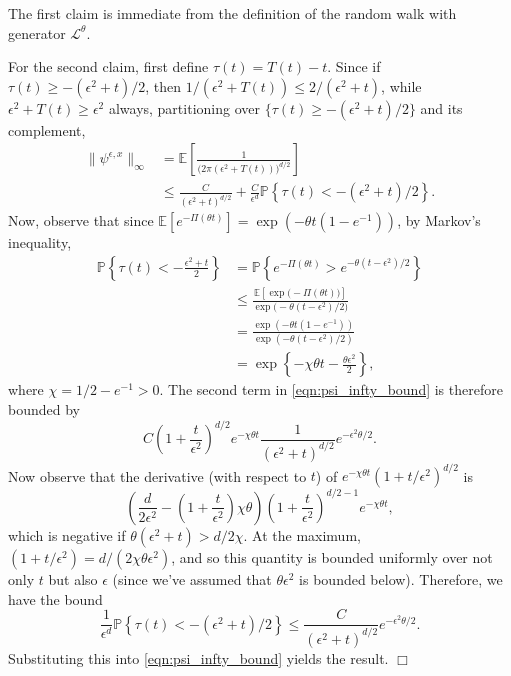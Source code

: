 \documentclass[12pt]{article}
\newenvironment {proof}{{\noindent\bf Proof }}{\hfill $\Box$ \medskip}
\newcommand{\IP}{\mathbb P}
\newcommand{\IE}{\mathbb E}
\numberwithin{equation}{section}
\begin{document}
\begin{proof}
    The first claim is immediate from the definition of the random walk 
with generator $\mathcal{L}^\theta$.

For the second claim, first define $\tau(t) = T(t)-t$.
Since if $\tau(t) \ge -(\epsilon^2 + t)/2$,
then $1/(\epsilon^2 + T(t)) \le 2/(\epsilon^2 + t)$,
while $\epsilon^2 + T(t) \ge \epsilon^2$ always,
partitioning over
$\{ \tau(t) \ge -(\epsilon^2 + t)/2 \}$ and its complement,
\begin{align}
   \| \psi^{\epsilon,x} \|_\infty
    &=
        \IE\left[ 
            \frac{1}{\big(2 \pi (\epsilon^2+T(t))\big)^{d/2}}
        \right] \nonumber
    \\ & \le
        \frac{C}{(\epsilon^2 + t)^{d/2}}
        + 
        \frac{C}{\epsilon^d}
        \IP\left\{
            \tau(t) < - (\epsilon^2 + t) / 2
        \right\}. \label{eqn:psi_infty_bound}
\end{align}
Now, observe that since $\IE[e^{-\Pi(\theta t)}] = \exp(-\theta t (1 - e^{-1}))$,
by Markov's inequality,
\begin{align}
    \IP\left\{
        \tau(t) < - \frac{\epsilon^2 + t}{2}
    \right\}
    &=
    \IP\left\{
        e^{-\Pi(\theta t)} > e^{-\theta (t - \epsilon^2) / 2}
    \right\}
\nonumber
\\
&\leq \frac{\IE[\exp\big(-\Pi(\theta t)\big)]}{\exp\big(-\theta(t-\epsilon^2)/2\big)}
\nonumber
    \\&=
    \frac{
        \exp(- \theta t(1 - e^{-1}))
    }{
        \exp(- \theta (t - \epsilon^2) / 2)
    }
\nonumber
    \\&=
    \exp\left\{ - \chi \theta t - \frac{\theta \epsilon^2}{2} \right\} ,
\label{bound for negative tau}
\end{align}
where $\chi = 1/2 - e^{-1} > 0$.
The second term in \eqref{eqn:psi_infty_bound} is therefore bounded by
\[
	C \left(1 + \frac{t}{\epsilon^2}\right)^{d/2} e^{-\chi \theta t }%
	\frac{1}{(\epsilon^2 + t)^{d/2}}e^{-\epsilon^2 \theta/2} .
\]
Now observe that the derivative (with respect to $t$) of 
	$e^{-\chi \theta t} %
	(1 + t/\epsilon^2)^{d/2}$ 
is
\[
    \left( \frac{d}{2 \epsilon^2} - \left(1 + \frac{t}{\epsilon^2}\right) \chi \theta \right)
    \left( 1 + \frac{t}{\epsilon^2} \right)^{d/2 - 1} e^{-\chi \theta t },%
\]
which is negative if $\theta(\epsilon^2 + t) > d/2 \chi$.
At the maximum, %
$(1 + t/\epsilon^2) = d /(2\chi \theta \epsilon^2)$,
and so this quantity is bounded uniformly over not only $t$ but also $\epsilon$
(since we've assumed that $\theta \epsilon^2$ is bounded below).
Therefore, 
we have the bound
\begin{equation}
	\label{small tau bound}
	\frac{1}{\epsilon^d}
        \IP\left\{
            \tau(t) < - (\epsilon^2 + t) / 2
        \right\}
\leq \frac{C}{(\epsilon^2 + t)^{d/2}} e^{-\epsilon^2\theta/2}.
\end{equation}
Substituting this into \eqref{eqn:psi_infty_bound} yields the result.
\end{proof}
\end{document}
